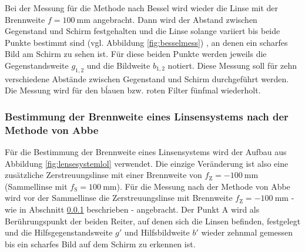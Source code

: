Bei der Messung für die Methode nach Bessel wird wieder die Linse mit der Brennweite
$f=\SI{100}{\milli\meter}$ angebracht.
Dann wird der Abstand zwischen Gegenstand und Schirm festgehalten und die Linse solange variiert
bis beide Punkte bestimmt sind (vgl. Abbildung \ref{fig:besselmess}) , an denen ein scharfes Bild am Schirm zu sehen ist.
Für diese beiden Punkte werden jeweils die Gegenstandsweite $g_{1,2}$ und die Bildweite
$b_{1,2}$ notiert. Diese Messung soll für zehn verschiedene Abstände zwischen Gegenstand und Schirm
durchgeführt werden.\\
Die Messung wird für den bĺauen bzw. roten Filter fünfmal wiederholt.
\subsubsection{Bestimmung der Brennweite eines Linsensystems nach der Methode von Abbe}
\label{sec:abbe}
Für die Bestimmung der Brennweite eines Linsensystems wird der Aufbau aus Abbildung
\ref{fig:lensesystemlol} verwendet.
Die einzige Veränderung ist also eine zusätzliche Zerstreuungslinse mit einer Brennweite von
$f_{\mathrm{Z}} = -\SI{100}{\milli\meter}$ (Sammellinse mit $f_{\mathrm{S}}=\SI{100}{\milli\meter}$).
Für die Messung nach der Methode von Abbe wird vor der Sammellinse die Zerstreuungslinse mit
Brennweite $f_{\mathrm{Z}}=-\SI{100}{\milli\meter}$ - wie in Abschnitt \ref{sec:abbe}
beschrieben - angebracht. Der Punkt A wird als Berührungspunkt der beiden Reiter, auf denen
sich die Linsen befinden, festgelegt und die Hilfsgegenstandsweite $g'$  und Hilfsbildweite $b'$ wieder zehnmal
gemessen bis ein scharfes Bild auf dem Schirm zu erkennen ist.
